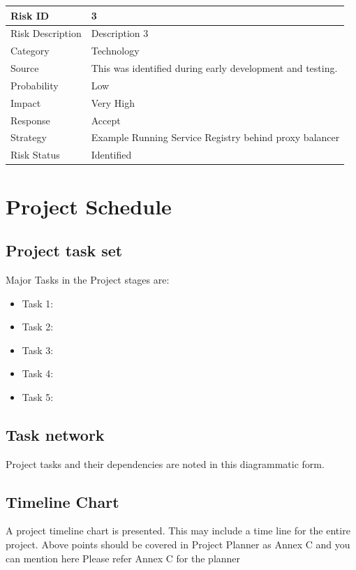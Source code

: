 \documentclass[oneside,a4paper,12pt]{report}
\begin{document}
\begin{table}[!htbp]
\begin{center}
\def\arraystretch{1.5}
\begin{tabularx}{\textwidth}{| l | X |}
\hline 
Risk ID	& 3 \\ \hline
Risk Description	& Description 3 \\ \hline
Category	& Technology \\ \hline
Source	& This was identified during early development and testing. \\ \hline
Probability	& Low \\ \hline
Impact	& Very High \\ \hline
Response	& Accept \\ \hline
Strategy	& Example Running Service Registry behind proxy balancer  \\ \hline
Risk Status	& Identified \\ \hline
\end{tabularx}
\end{center}
\label{tab:risk3}
\end{table}

\section{Project Schedule}  
\subsection{Project task set}  
Major Tasks in the Project stages are:
\begin{itemize}
  \item Task 1:
  \item Task 2: 
  \item Task 3: 
  \item Task 4: 
  \item Task 5: 
\end{itemize}

\subsection{Task network}  
Project tasks and their dependencies are noted in this diagrammatic form.
\subsection{Timeline Chart}  
A project timeline chart is presented. This may include a time line for the entire project.
Above points should be covered  in Project Planner as Annex C and you can mention here Please refer Annex C for the planner
\end{document}
